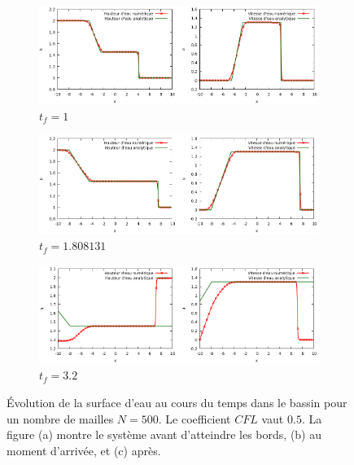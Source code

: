 \documentclass[
	french,
	11pt, %
]{fphw}
\begin{document}
\begin{figure}[H]
	\centering
	\begin{subfigure}[b]{0.9\textwidth}
		\centering
		\includegraphics[width=\textwidth]{PiscineBornee4.png}
		\caption{$t_{f}=1$}
		\label{fig:Piscine2A}
	\end{subfigure}
	\begin{subfigure}[b]{0.9\textwidth}
		\centering
		\includegraphics[width=\textwidth]{PiscineBornee5.png}
		\caption{$t_{f}=1.808131$}
		\label{fig:Piscine2B}
	\end{subfigure}
	\begin{subfigure}[b]{0.9\textwidth}
		\centering
		\includegraphics[width=\textwidth]{PiscineBornee6.png}
		\caption{$t_{f}=3.2$}
		\label{fig:Piscine2C}
	\end{subfigure}
	\caption{Évolution de la surface d'eau au cours du temps dans le bassin pour un nombre de mailles $N=500$. Le coefficient $CFL$ vaut $0.5$. La figure (a) montre le système avant d'atteindre les bords, (b) au moment d'arrivée, et (c) après.}
	\label{fig:Piscine2}
\end{figure}
\end{document}
